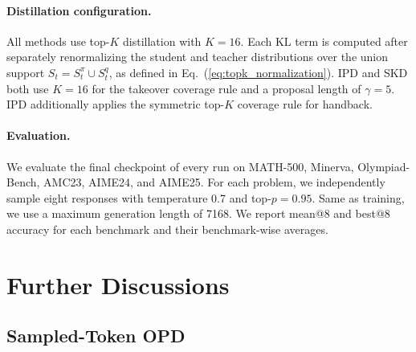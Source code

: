 \documentclass{article} %
\begin{document}
\paragraph{Distillation configuration.} All methods use top-$K$ distillation with $K=16$. Each KL term is computed after separately renormalizing the student and teacher distributions over the union support $S_t=S_t^\pi\cup S_t^q$, as defined in Eq.~(\ref{eq:topk_normalization}). IPD and SKD both use $K=16$ for the takeover coverage rule and a proposal length of $\gamma=5$. IPD additionally applies the symmetric top-$K$ coverage rule for handback.

\paragraph{Evaluation.} We evaluate the final checkpoint of every run on MATH-500, Minerva, Olympiad-Bench, AMC23, AIME24, and AIME25. For each problem, we independently sample eight responses with temperature 0.7 and top-$p=0.95$. Same as training, we use a maximum generation length of 7168. We report mean@8 and best@8 accuracy for each benchmark and their benchmark-wise averages. 

\section{Further Discussions}
\subsection{Sampled-Token OPD}
\label{app:sampled_token}
\end{document}
